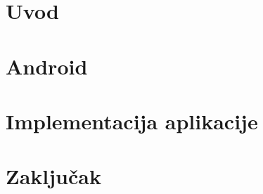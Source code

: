 \documentclass[12pt,oneside]{memoir}
\begin{document}
\frontmatter

\naslovna

\komisija

\apstrakt

\tableofcontents*

\mainmatter

\chapter{Uvod}


\chapter{Android}
\label{chp:android}


\chapter{Implementacija aplikacije}
\label{chp:implementacija}



\chapter{Zaključak}

\literatura

\backmatter
\end{document}
